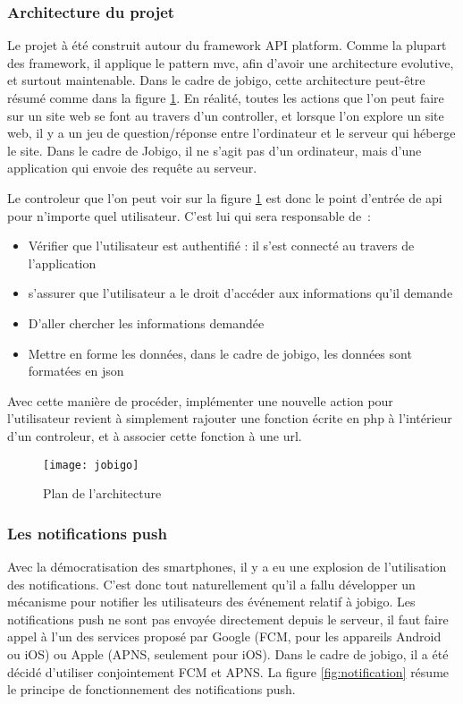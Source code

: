 \documentclass[../rapport.tex]{subfiles}
\begin{document}
        \subsubsection{Architecture du projet}
        Le projet à été construit autour du framework API platform. Comme la plupart des framework, il applique le pattern \gls{mvc},
        afin d'avoir une architecture evolutive, et surtout maintenable. Dans le cadre de jobigo, cette architecture peut-être résumé comme dans la figure \ref{fig:jobigo}.
        En réalité, toutes les actions que l'on peut faire sur un site web se font au travers d'un controller, et lorsque l'on explore un site web, il y a un jeu de question/réponse entre l'ordinateur et le serveur qui héberge le site. Dans le cadre de Jobigo, il ne s'agit pas d'un ordinateur, mais d'une application qui envoie des requête au serveur.

        Le controleur que l'on peut voir sur la figure \ref{fig:jobigo} est donc le point d'entrée de \gls{api} pour n'importe quel utilisateur. C'est lui qui sera responsable de~: 
        \begin{itemize}
            \item Vérifier que l'utilisateur est authentifié : il s'est connecté au travers de l'application
            \item s'assurer que l'utilisateur a le droit d'accéder aux informations qu'il demande
            \item D'aller chercher les informations demandée
            \item Mettre en forme les données, dans le cadre de jobigo, les données sont formatées en \gls{json}
        \end{itemize}

        Avec cette manière de procéder, implémenter une nouvelle action pour l'utilisateur revient à simplement rajouter une fonction écrite en php 
        à l'intérieur d'un controleur, et à associer cette fonction à une url.

        \begin{figure}
            \centering
            \texttt{[image: jobigo]}
            \caption{Plan de l'architecture}
            \label{fig:jobigo}
        \end{figure}

        \subsubsection{Les notifications push}
        Avec la démocratisation des smartphones, il y a eu une explosion de l'utilisation des notifications. C'est donc tout naturellement
        qu'il a fallu développer un mécanisme pour notifier les utilisateurs des événement relatif à jobigo.
        Les notifications push ne sont pas envoyée directement depuis le serveur, il faut faire appel à l'un des services proposé par Google (FCM, pour les appareils Android ou iOS) ou Apple (APNS, seulement pour iOS). Dans le cadre de jobigo, il a été décidé d'utiliser conjointement FCM et APNS.
        La figure \ref{fig:notification} résume le principe de fonctionnement des notifications push.
\end{document}
